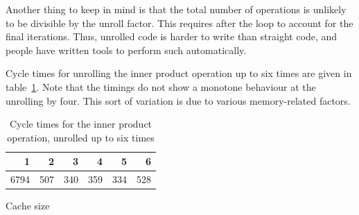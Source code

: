Another thing to keep in mind is that the total number of operations
is unlikely to be divisible by the unroll factor. This requires
 after the loop to account for the final
iterations. Thus, unrolled code is harder to write than straight code,
and people have written tools to perform such
 automatically.

Cycle times for unrolling the inner product operation up to six times
are given in table~\ref{tab:unroll-inner}. Note that the timings do
not show a monotone behaviour at the unrolling by four. This sort of
variation is due to various memory-related factors.

\begin{table}[ht]
\leavevmode\kern\unitindent
  \begin{tabular}{|rrrrrr|}
    \hline
    1&2&3&4&5&6\\ \hline 6794&507&340&359&334&528\\ \hline
  \end{tabular}
  \caption{Cycle times for the inner product operation, unrolled up to
    six times}
  \label{tab:unroll-inner}
\end{table}


 {Cache size}
\label{sec:coding-cachesize}

